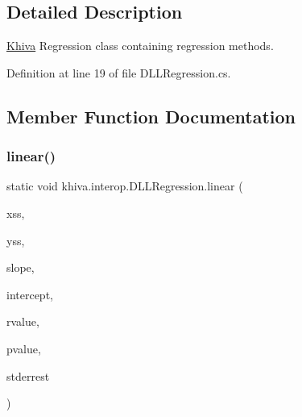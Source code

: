 \subsection{Detailed Description}
\mbox{\hyperlink{classkhiva_1_1_khiva}{Khiva}} Regression class containing regression methods. 



Definition at line 19 of file D\+L\+L\+Regression.\+cs.



\subsection{Member Function Documentation}
\mbox{\label{classkhiva_1_1interop_1_1_d_l_l_regression_ad3c7e4dbe514d3a447af192b983e77a7}} 
\subsubsection{\texorpdfstring{linear()}{linear()}}
{\footnotesize\ttfamily static void khiva.\+interop.\+D\+L\+L\+Regression.\+linear (\begin{DoxyParamCaption}\item[{\mbox{[}\+In\mbox{]} ref Int\+Ptr}]{xss,  }\item[{\mbox{[}\+In\mbox{]} ref Int\+Ptr}]{yss,  }\item[{\mbox{[}\+Out\mbox{]} out Int\+Ptr}]{slope,  }\item[{\mbox{[}\+Out\mbox{]} out Int\+Ptr}]{intercept,  }\item[{\mbox{[}\+Out\mbox{]} out Int\+Ptr}]{rvalue,  }\item[{\mbox{[}\+Out\mbox{]} out Int\+Ptr}]{pvalue,  }\item[{\mbox{[}\+Out\mbox{]} out Int\+Ptr}]{stderrest }\end{DoxyParamCaption})\hspace{0.3cm}{\ttfamily [static]}}



